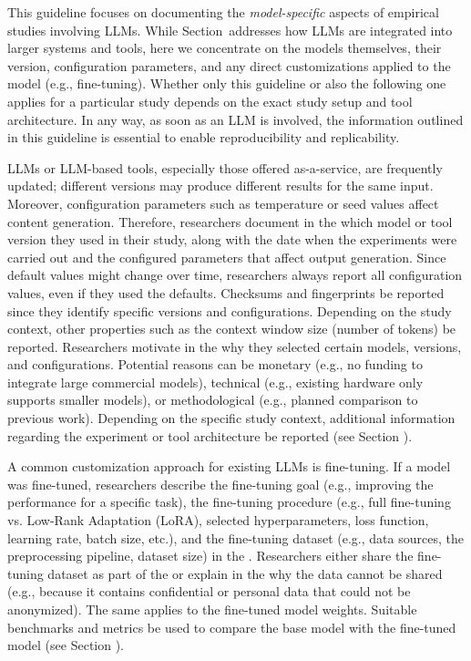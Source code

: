 This guideline focuses on documenting the \emph{model-specific} aspects of empirical studies involving LLMs.
While Section~\toolarchitecture addresses how LLMs are integrated into larger systems and tools, here we concentrate on the models themselves, their version, configuration parameters, and any direct customizations applied to the model (e.g., fine-tuning).
Whether only this guideline or also the following one applies for a particular study depends on the exact study setup and tool architecture.
In any way, as soon as an LLM is involved, the information outlined in this guideline is essential to enable reproducibility and replicability.


LLMs or LLM-based tools, especially those offered as-a-service, are frequently updated; different versions may produce different results for the same input.
Moreover, configuration parameters such as temperature or seed values affect content generation.
Therefore, researchers \must document in the \paper which model or tool version they used in their study, along with the date when the experiments were carried out and the configured parameters that affect output generation.
Since default values might change over time, researchers \should always report all configuration values, even if they used the defaults.
Checksums and fingerprints \may be reported since they identify specific versions and configurations.
Depending on the study context, other properties such as the context window size (number of tokens) \may be reported.
Researchers \should motivate in the \paper why they selected certain models, versions, and configurations.
Potential reasons can be monetary (e.g., no funding to integrate large commercial models), technical (e.g., existing hardware only supports smaller models), or methodological (e.g., planned comparison to previous work).
Depending on the specific study context, additional information regarding the experiment or tool architecture \should be reported (see Section \toolarchitecture).

A common customization approach for existing LLMs is fine-tuning.
If a model was fine-tuned, researchers \must describe the fine-tuning goal (e.g., improving the performance for a specific task), the fine-tuning procedure (e.g., full fine-tuning vs. Low-Rank Adaptation (LoRA), selected hyperparameters, loss function, learning rate, batch size, etc.), and the fine-tuning dataset (e.g., data sources, the preprocessing pipeline, dataset size) in the \paper.
Researchers \should either share the fine-tuning dataset as part of the \supplementarymaterial or explain in the \paper why the data cannot be shared (e.g., because it contains confidential or personal data that could not be anonymized).
The same applies to the fine-tuned model weights.
Suitable benchmarks and metrics \should be used to compare the base model with the fine-tuned model (see Section \benchmarksmetrics).

